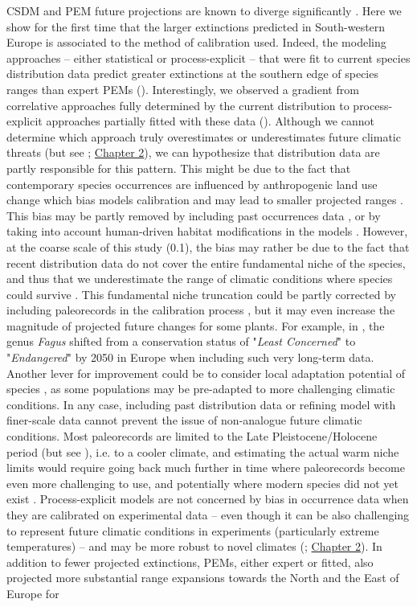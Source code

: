 CSDM and PEM future projections are known to diverge significantly \citep{Morin2009, Keenan2011a, Cheaib2012, Takolander2019}.
Here we show for the first time that the larger extinctions predicted in South-western Europe is associated to the method of calibration used. Indeed, the modeling approaches -- either statistical or process-explicit -- that were fit to current species distribution data predict greater extinctions at the southern edge of species ranges than expert PEMs (). Interestingly, we observed a gradient from correlative approaches fully determined by the current distribution to process-explicit approaches partially fitted with these data (). Although we cannot determine which approach truly overestimates or underestimates future climatic threats (but see \citealp{VanderMeersch2024}; \hyperref[chapter2]{Chapter 2}), we can hypothesize that distribution data are partly responsible for this pattern. This might be due to the fact that contemporary species occurrences are influenced by anthropogenic land use change which bias models calibration and may lead to smaller projected ranges \citep{Ay2017, Faurby2018}. This bias may be partly removed by including past occurrences data \citep{Faurby2018}, or by taking into account human-driven habitat modifications in the models \citep{Ay2017}. However, at the coarse scale of this study (0.1\degree), the bias may rather be due to the fact that recent distribution data do not cover the entire fundamental niche of the species, and thus that we underestimate the range of climatic conditions where species could survive \citep{NoguesBravo2016, Chevalier2024}. This fundamental niche truncation could be partly corrected by including paleorecords in the calibration process \citep{Maiorano2013}, but it may even increase the magnitude of projected future changes for some plants. For example, in \citet{NoguesBravo2016}, the genus \emph{Fagus} shifted from a conservation status of "\emph{Least Concerned}" to "\emph{Endangered}" by 2050 in Europe when including such very long-term data. Another lever for improvement could be to consider local adaptation potential of species \citep{BenitoGarzon2011}, as some populations may be pre-adapted to more challenging climatic conditions. In any case, including past distribution data or refining model with finer-scale data cannot prevent the issue of non-analogue future climatic conditions. Most paleorecords are limited to the Late Pleistocene/Holocene period (but see \citealp{Chiarenza2023}), i.e. to a cooler climate, and estimating the actual warm niche limits would require going back much further in time where paleorecords become even more challenging to use, and potentially where modern species did not yet exist \citep{Burke2018, Chevalier2024}. Process-explicit models are not concerned by bias in occurrence data when they are calibrated on experimental data -- even though it can be also challenging to represent future climatic conditions in experiments (particularly extreme temperatures) -- and may be more robust to novel climates (\citealp{VanderMeersch2024}; \hyperref[chapter2]{Chapter 2}). In addition to fewer projected extinctions, PEMs, either expert or fitted, also projected more substantial range expansions towards the North and the East of Europe for 